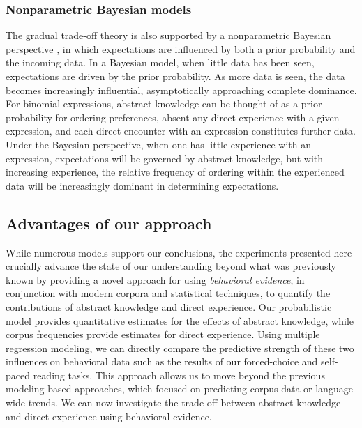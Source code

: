 \documentclass[authoryear]{elsarticle}
\begin{document}
\subsubsection{Nonparametric Bayesian models}
The gradual trade-off theory is also supported by a nonparametric Bayesian perspective \citep[e.g.][]{Goldwater:2009jy,Xu:2007dt}, in which expectations are influenced by both a prior probability and the incoming data. In a Bayesian model, when little data has been seen, expectations are driven by the prior probability. As more data is seen, the data becomes increasingly influential, asymptotically approaching complete dominance. For binomial expressions, abstract knowledge can be thought of as a prior probability for ordering preferences, absent any direct experience with a given expression, and each direct encounter with an expression constitutes further data. Under the Bayesian perspective, when one has little experience with an expression, expectations will be governed by abstract knowledge, but with increasing experience, the relative frequency of ordering within the experienced data will be increasingly dominant in determining expectations.

\subsection{Advantages of our approach}
While numerous models support our conclusions, the experiments presented here crucially advance the state of our understanding beyond what was previously known by providing a novel approach for using \emph{behavioral evidence}, in conjunction with modern corpora and statistical techniques, to quantify the contributions of abstract knowledge and direct experience. Our probabilistic model provides quantitative estimates for the effects of abstract knowledge, while corpus frequencies provide estimates for direct experience. Using multiple regression modeling, we can directly compare the predictive strength of these two influences on behavioral data such as the results of our forced-choice and self-paced reading tasks. This approach allows us to move beyond the previous modeling-based approaches, which focused on predicting corpus data or language-wide trends. We can now investigate the trade-off between abstract knowledge and direct experience using behavioral evidence.
\end{document}
